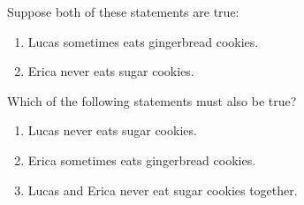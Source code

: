 Suppose both of these statements are true:
\begin{enumerate}
\item[(1)] Lucas sometimes eats gingerbread cookies.
\item[(2)] Erica never eats sugar cookies.
\end{enumerate}
Which of the following statements must also be true?
\begin{enumerate}
\item[I.] Lucas never eats sugar cookies.
\item[II.] Erica sometimes eats gingerbread cookies.
\item[III.] Lucas and Erica never eat sugar cookies together.
\end{enumerate}

